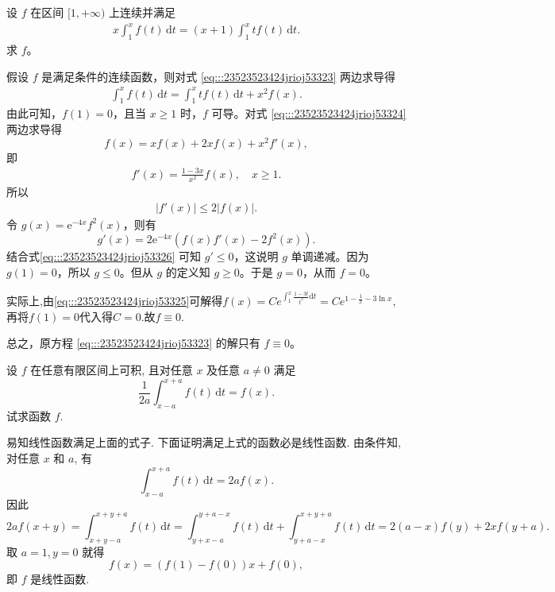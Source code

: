 \documentclass[../../main.tex]{subfiles}
\begin{document}
\begin{example}
设 \( f \) 在区间 \([1,+\infty)\) 上连续并满足
\begin{align}
x \int_{1}^{x} f(t) \, \mathrm{d}t = (x + 1) \int_{1}^{x} t f(t) \, \mathrm{d}t. \label{eq:::23523523424jrioj53323}
\end{align}
求 \( f \)。
\end{example}
\begin{solution}
假设 \( f \) 是满足条件的连续函数，则对式 \eqref{eq:::23523523424jrioj53323}  两边求导得
\begin{align}
\int_{1}^{x} f(t) \, \mathrm{d}t = \int_{1}^{x} t f(t) \, \mathrm{d}t + x^2 f(x). \label{eq:::23523523424jrioj53324}
\end{align}
由此可知，\( f(1) = 0 \)，且当 \( x \geqslant 1 \) 时，\( f \) 可导。对式 \eqref{eq:::23523523424jrioj53324} 两边求导得
\[
f(x) = x f(x) + 2x f(x) + x^2 f'(x),
\]
即
\begin{align}
f'(x) = \frac{1 - 3x}{x^2} f(x), \quad x \geqslant 1. \label{eq:::23523523424jrioj53325}
\end{align}
所以
\begin{align}
|f'(x)| \leqslant 2 |f(x)|. \label{eq:::23523523424jrioj53326}
\end{align}
令 \( g(x) = \mathrm{e}^{-4x} f^2(x) \)，则有
\[
g'(x) = 2 \mathrm{e}^{-4x} \left( f(x) f'(x) - 2 f^2(x) \right).
\]
结合式\eqref{eq:::23523523424jrioj53326} 可知 \( g' \leqslant 0 \)，这说明 \( g \) 单调递减。因为 \( g(1) = 0 \)，所以 \( g \leqslant 0 \)。但从 \( g \) 的定义知 \( g \geqslant 0 \)。于是 \( g = 0 \)，从而 \( f = 0 \)。

实际上,由\eqref{eq:::23523523424jrioj53325}可解得$f\left( x \right) =Ce^{\int_1^x{\frac{1-3t}{t^2}\mathrm{d}t}}=Ce^{1-\frac{1}{x}-3\ln x},$再将$f(1)=0$代入得$C=0.$故$f\equiv 0.$

总之，原方程 \eqref{eq:::23523523424jrioj53323} 的解只有 \( f \equiv 0 \)。

\end{solution}

\begin{example}
设 \( f \) 在任意有限区间上可积, 且对任意 \( x \) 及任意 \( a \neq 0 \) 满足
\[
\frac{1}{2a} \int_{x - a}^{x + a} f(t) \, \mathrm{d}t = f(x).
\]
试求函数 \( f \).
\end{example}
\begin{solution}
易知线性函数满足上面的式子. 下面证明满足上式的函数必是线性函数. 由条件知, 对任意 \( x \) 和 \( a \), 有
\[
\int_{x - a}^{x + a} f(t) \, \mathrm{d}t = 2a f(x).
\]
因此
\[
2a f(x + y) = \int_{x + y - a}^{x + y + a} f(t) \, \mathrm{d}t = \int_{y + x - a}^{y + a - x} f(t) \, \mathrm{d}t + \int_{y + a - x}^{x + y + a} f(t) \, \mathrm{d}t
= 2(a - x) f(y) + 2x f(y + a).
\]
取 \( a = 1, y = 0 \) 就得
\[
f(x) = (f(1) - f(0))x + f(0),
\]
即 \( f \) 是线性函数.

\end{solution}
\end{document}
